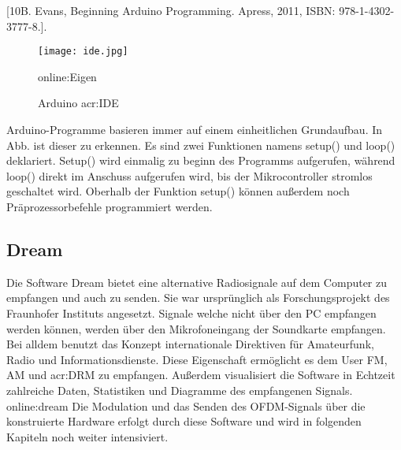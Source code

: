 [10B. Evans, Beginning Arduino Programming. Apress, 2011, ISBN: 978-1-4302-
3777-8.].

\begin{figure}[H]
	\centering
	\texttt{[image: ide.jpg]}
	\caption[Arduino \gls{acr:IDE}]{Arduino \gls{acr:IDE}}\gls{online:Eigen}
	\label{fig:ide}
\end{figure}


Arduino-Programme basieren immer auf einem einheitlichen Grundaufbau. In Abb. ist
dieser zu erkennen. Es sind zwei Funktionen namens setup() und loop() deklariert.
Setup() wird einmalig zu beginn des Programms aufgerufen, während loop() direkt im Anschuss aufgerufen wird, bis der Mikrocontroller stromlos geschaltet wird. Oberhalb der Funktion setup() können außerdem noch Präprozessorbefehle programmiert werden.

\subsection{Dream}
\label{subsec:Unterabschnitt12}
Die Software Dream bietet eine alternative Radiosignale auf dem Computer zu empfangen und auch zu senden. Sie war ursprünglich als Forschungsprojekt des Fraunhofer Instituts angesetzt. Signale welche nicht über den PC empfangen werden können, werden über den Mikrofoneingang der Soundkarte empfangen.
Bei alldem benutzt das Konzept internationale Direktiven für Amateurfunk, Radio und Informationsdienste.
Diese Eigenschaft ermöglicht es dem User FM, AM und \gls{acr:DRM} zu empfangen. Außerdem visualisiert die Software in Echtzeit zahlreiche Daten, Statistiken und Diagramme des empfangenen Signals. \gls{online:dream} Die Modulation und das Senden des OFDM-Signals über die konstruierte Hardware erfolgt durch diese Software und wird in folgenden Kapiteln noch weiter intensiviert.